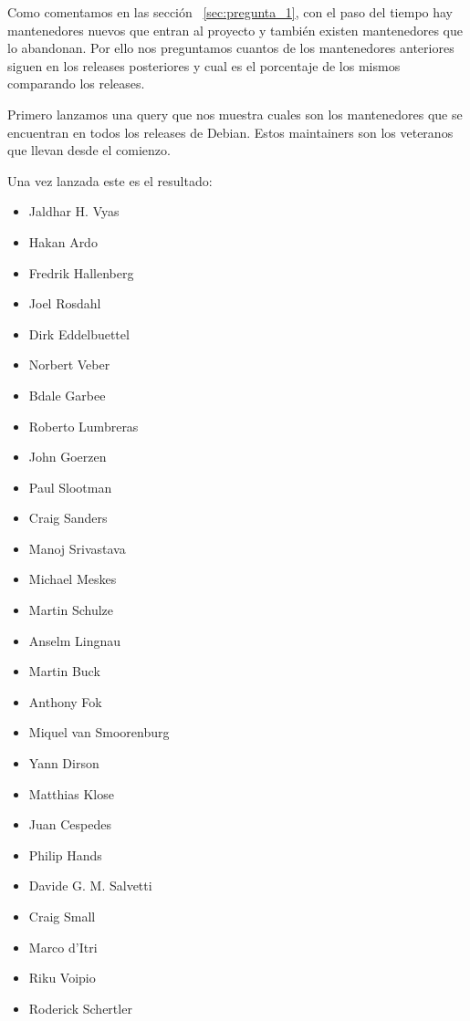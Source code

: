 \documentclass[a4paper, 12pt]{book}
\begin{document}
Como comentamos en las sección ~\ref{sec:pregunta_1}, con el paso del tiempo hay mantenedores nuevos que entran al proyecto y también existen mantenedores que lo abandonan. Por ello nos preguntamos cuantos de los mantenedores anteriores siguen en los releases posteriores y cual es el porcentaje de los mismos comparando los releases.

Primero lanzamos una query que nos muestra cuales son los mantenedores que se encuentran en todos los releases de Debian. Estos maintainers son los veteranos que llevan desde el comienzo.

Una vez lanzada este es el resultado:
 

	\begin{multicols}{3}
		\begin{itemize}
			\item Jaldhar H. Vyas
			\item Hakan Ardo
			\item Fredrik Hallenberg
			\item Joel Rosdahl
			\item Dirk Eddelbuettel
			\item Norbert Veber
			\item Bdale Garbee
			\item Roberto Lumbreras
			\item John Goerzen
			\item Paul Slootman
			\item Craig Sanders
			\item Manoj Srivastava
			\item Michael Meskes
			\item Martin Schulze
			\item Anselm Lingnau
			\item Martin Buck
			\item Anthony Fok
			\item Miquel van Smoorenburg
			\item Yann Dirson
			\item Matthias Klose
			\item Juan Cespedes
			\item Philip Hands
			\item Davide G. M. Salvetti
			\item Craig Small
			\item Marco d'Itri
			\item Riku Voipio
			\item Roderick Schertler
		\end{itemize}
	\end{multicols}
		
\end{document}
